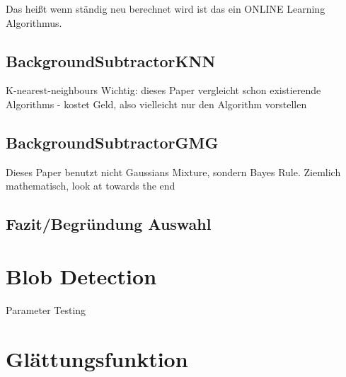 Das heißt wenn ständig neu berechnet wird ist das ein ONLINE Learning Algorithmus.
\cite{Bowden}
\subsection{BackgroundSubtractorKNN}
K-nearest-neighbours
Wichtig: dieses Paper vergleicht schon existierende Algorithms
- kostet Geld, also vielleicht nur den Algorithm vorstellen
\cite{ZIVKOVIC2006773}
\subsection{BackgroundSubtractorGMG}
Dieses Paper benutzt nicht Gaussians Mixture, sondern Bayes Rule. Ziemlich mathematisch, look at towards the end
\cite{6315174}
\subsection{Fazit/Begründung Auswahl}
\section{Blob Detection}
Parameter Testing
\section{Glättungsfunktion}